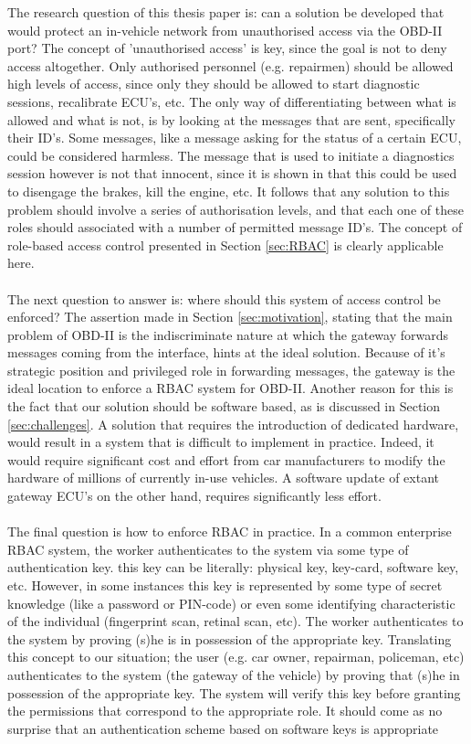 The research question of this thesis paper is: can a solution be developed that would protect an in-vehicle network from unauthorised access via the OBD-II port? The concept of 'unauthorised access' is key, since the goal is not to deny access altogether. Only authorised personnel (e.g. repairmen) should be allowed high levels of access, since only they should be allowed to start diagnostic sessions, recalibrate ECU's, etc. The only way of differentiating between what is allowed and what is not, is by looking at the messages that are sent, specifically their ID's. Some messages, like a message asking for the status of a certain ECU, could be considered harmless. The message that is used to initiate a diagnostics session however is not that innocent, since it is shown in \cite{MillerC} that this could be used to disengage the brakes, kill the engine, etc. It follows that any solution to this problem should involve a series of authorisation levels, and that each one of these roles should associated with a number of permitted message ID's. The concept of role-based access control presented in Section \ref{sec:RBAC} is clearly applicable here. \\ \\ The next question to answer is: where should this system of access control be enforced? The assertion made in Section \ref{sec:motivation}, stating that the main problem of OBD-II is the indiscriminate nature at which the gateway forwards messages coming from the interface, hints at the ideal solution. Because of it's strategic position and privileged role in forwarding messages, the gateway is the ideal location to enforce a RBAC system for OBD-II. Another reason for this is the fact that our solution should be software based, as is discussed in Section \ref{sec:challenges}. A solution that requires the introduction of dedicated hardware, would result in a system that is difficult to implement in practice. Indeed, it would require significant cost and effort from car manufacturers to modify the hardware of millions of currently in-use vehicles. A software update of extant gateway ECU's on the other hand, requires significantly less effort. \\ \\ The final question is how to enforce RBAC in practice. In a common enterprise RBAC system, the worker authenticates to the system via some type of authentication key. this key can be literally: physical key, key-card, software key, etc. However, in some instances this key is represented by some type of secret knowledge (like a password or PIN-code) or even some identifying characteristic of the individual (fingerprint scan, retinal scan, etc). The  worker authenticates to the system by proving (s)he is in possession of the appropriate key. Translating this concept to our situation; the user (e.g. car owner, repairman, policeman, etc) authenticates to the system (the gateway of the vehicle) by proving that (s)he in possession of the appropriate key. The system will verify this key before granting the permissions that correspond to the appropriate role. It should come as no surprise that an authentication scheme based on software keys is appropriate 